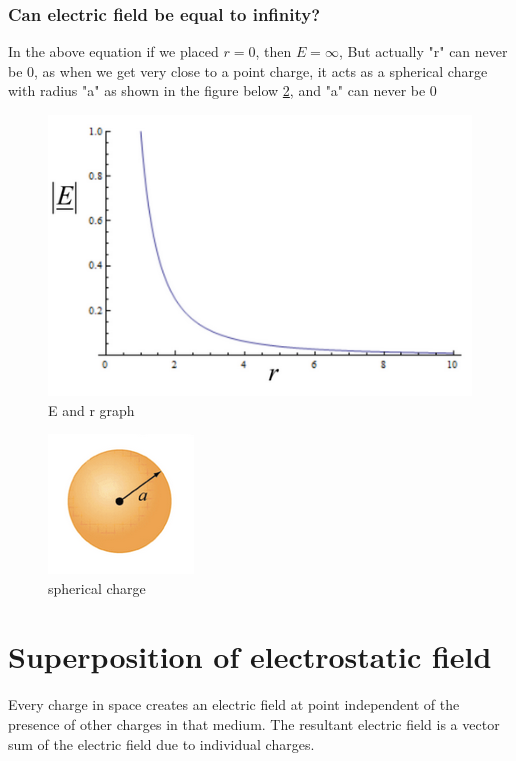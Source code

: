 \documentclass[12 pt]{article}
\begin{document}
\subsubsection{Can electric field be equal to infinity?}
In the above equation if we placed $r=0$, then $E=\infty$, But actually "r" can never be 0, as when we get very close to a point charge, it acts as a spherical charge with radius "a" as shown in the figure below \ref{electro3}, and "a" can never be 0 
\begin{minipage}{0.45\linewidth}
    \begin{figure}[H]
    \centering
    \includegraphics[scale=0.35]{./images/electrostatic2}
    \caption{E and r graph}
    \label{electro2} 
    \end{figure}
\end{minipage}
\begin{minipage}{0.5\linewidth}
    \begin{figure}[H]
    \centering
    \includegraphics[scale=0.85]{./images/electrostatic3}
    \caption{spherical charge}
    \label{electro3} 
    \end{figure}
\end{minipage}
\section{Superposition of electrostatic field}
Every charge in space creates an electric field at point independent of the presence of other charges in that medium. The resultant electric field is a vector sum of the electric field due to individual charges.
\end{document}
